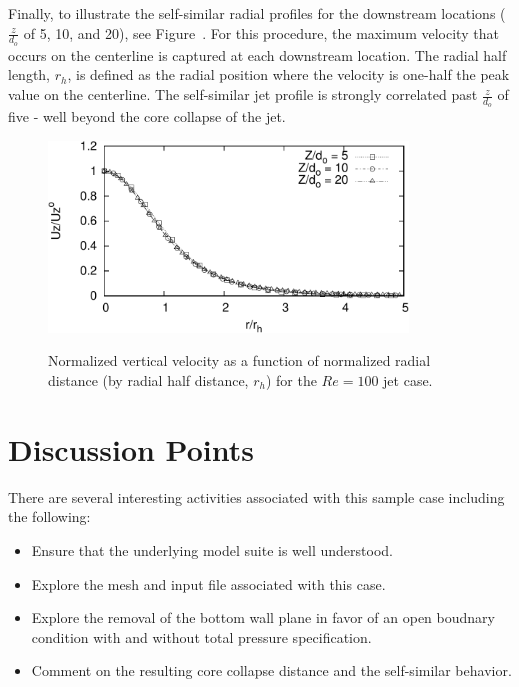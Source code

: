 \documentclass{article}
\begin{document}
Finally, to illustrate the self-similar radial profiles for the downstream locations ($\frac{z}{d_o}$ of 5, 10,
and 20), see Figure~\cite{fig:simular}. For this procedure, the maximum velocity that occurs on the centerline
is captured at each downstream location. The radial half length, $r_h$, is defined as the radial position where the
velocity is one-half the peak value on the centerline. The self-similar jet profile is strongly correlated past 
$\frac{z}{d_o}$ of five - well beyond the core collapse of the jet.

\begin{figure}[!htbp]
  \centering
  {
   \includegraphics[height=2.0in]{images/ZdHalf-crop.pdf}
  }
  \caption{Normalized vertical velocity as a function of normalized radial distance (by radial half distance, 
$r_h$) for the $Re = 100$ jet case.}
  \label{fig:results}
\end{figure}

\section{Discussion Points}

There are several interesting activities associated with this sample case including
the following:

\begin{itemize}
	\item Ensure that the underlying model suite is well understood.
	\item Explore the mesh and input file associated with this case.
	\item Explore the removal of the bottom wall plane in favor of an open boudnary condition with 
          and without total pressure specification.
        \item Comment on the resulting core collapse distance and the self-similar behavior.
\end{itemize}
\end{document}
